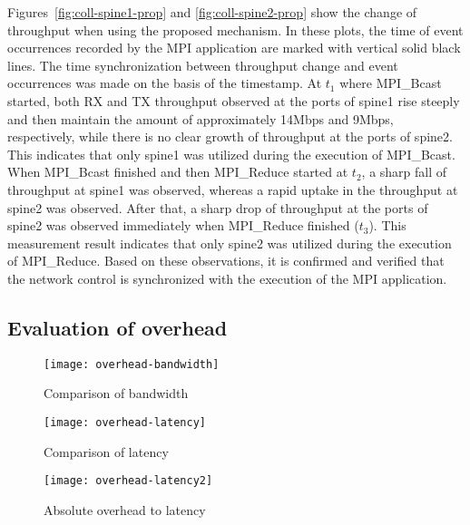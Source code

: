 Figures~\ref{fig:coll-spine1-prop} and \ref{fig:coll-spine2-prop} show
the change of throughput when using the proposed mechanism. In these
plots, the time of event occurrences recorded by the MPI application are
marked with vertical solid black lines. The time synchronization between
throughput change and event occurrences was made on the basis of the
timestamp. At \(t_1\) where MPI\_Bcast started, both RX and TX
throughput observed at the ports of spine1 rise steeply and then
maintain the amount of approximately 14Mbps and 9Mbps, respectively,
while there is no clear growth of throughput at the ports of spine2.
This indicates that only spine1 was utilized during the execution of
MPI\_Bcast. When MPI\_Bcast finished and then MPI\_Reduce started at
\(t_2\), a sharp fall of throughput at spine1 was observed, whereas a
rapid uptake in the throughput at spine2 was observed. After that, a
sharp drop of throughput at the ports of spine2 was observed immediately
when MPI\_Reduce finished (\(t_3\)). This measurement result indicates
that only spine2 was utilized during the execution of MPI\_Reduce. Based
on these observations, it is confirmed and verified that the network
control is synchronized with the execution of the MPI application.

\hypertarget{evaluation-of-overhead}{%
\subsection{Evaluation of overhead}\label{evaluation-of-overhead}}

\begin{figure}
    \centering
    \texttt{[image: overhead-bandwidth]}
    \caption{Comparison of bandwidth}
    \label{fig:overhead-bandwidth}
\end{figure}

\begin{figure}
    \centering
    \texttt{[image: overhead-latency]}
    \caption{Comparison of latency}
    \label{fig:overhead-latency}
\end{figure}

\begin{figure}
    \centering
    \texttt{[image: overhead-latency2]}
    \caption{Absolute overhead to latency}
    \label{fig:overhead-latency-2}
\end{figure}


